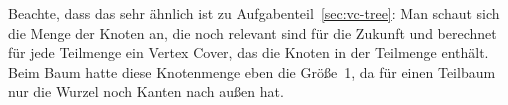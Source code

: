 Beachte, dass das sehr ähnlich ist zu Aufgabenteil~\ref{sec:vc-tree}:
Man schaut sich die Menge der Knoten an, die noch relevant sind für
die Zukunft und berechnet für jede Teilmenge ein Vertex Cover, das die
Knoten in der Teilmenge enthält.  Beim Baum hatte diese Knotenmenge
eben die Größe~1, da für einen Teilbaum nur die Wurzel noch Kanten
nach außen hat.


